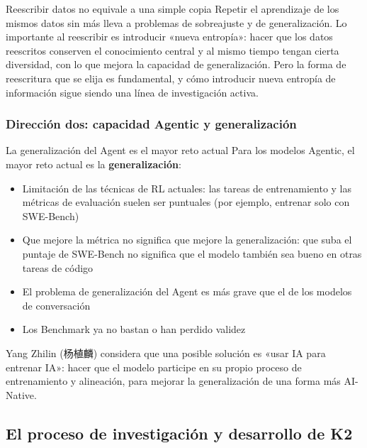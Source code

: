 \documentclass[a4paper]{article}
\begin{document}
\begin{warningbox}{Reescribir datos no equivale a una simple copia}
Repetir el aprendizaje de los mismos datos sin más lleva a problemas de sobreajuste y de generalización. Lo importante al reescribir es introducir «nueva entropía»: hacer que los datos reescritos conserven el conocimiento central y al mismo tiempo tengan cierta diversidad, con lo que mejora la capacidad de generalización. Pero la forma de reescritura que se elija es fundamental, y cómo introducir nueva entropía de información sigue siendo una línea de investigación activa.
\end{warningbox}

\subsubsection{Dirección dos: capacidad Agentic y generalización}

\begin{importantbox}{La generalización del Agent es el mayor reto actual}
Para los modelos Agentic, el mayor reto actual es la \textbf{generalización}:
\begin{itemize}
    \item Limitación de las técnicas de RL actuales: las tareas de entrenamiento y las métricas de evaluación suelen ser puntuales (por ejemplo, entrenar solo con SWE-Bench)
    \item Que mejore la métrica no significa que mejore la generalización: que suba el puntaje de SWE-Bench no significa que el modelo también sea bueno en otras tareas de código
    \item El problema de generalización del Agent es más grave que el de los modelos de conversación
    \item Los Benchmark ya no bastan o han perdido validez
\end{itemize}
\end{importantbox}

Yang Zhilin (杨植麟) considera que una posible solución es «usar IA para entrenar IA»: hacer que el modelo participe en su propio proceso de entrenamiento y alineación, para mejorar la generalización de una forma más AI-Native.

\subsection{El proceso de investigación y desarrollo de K2}
\end{document}
